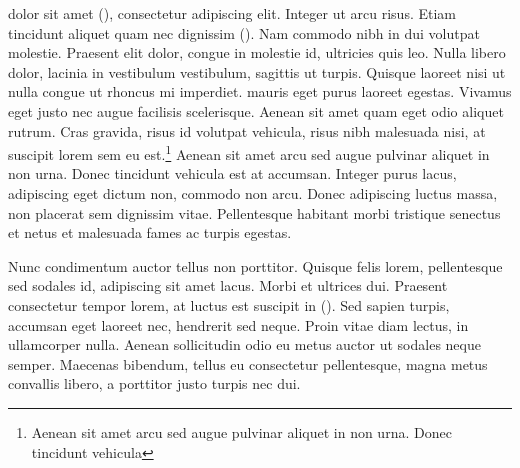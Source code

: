 
{}
 dolor sit amet (), consectetur adipiscing elit.\citep{Nacuzzi:2007} Integer ut arcu risus. Etiam tincidunt aliquet quam nec dignissim (). Nam commodo nibh in dui volutpat molestie. Praesent elit dolor, congue in molestie id, ultricies quis leo. Nulla libero dolor, lacinia in vestibulum vestibulum, sagittis ut turpis. Quisque laoreet nisi ut nulla congue ut rhoncus mi imperdiet.  mauris eget purus laoreet egestas.\citep{Cooper:1939} Vivamus eget justo nec augue facilisis scelerisque. Aenean sit amet quam eget odio aliquet rutrum. Cras gravida, risus id volutpat vehicula, risus nibh malesuada nisi, at suscipit lorem sem eu est.\footnote{Aenean sit amet arcu sed augue pulvinar aliquet in non urna. Donec tincidunt vehicula} Aenean sit amet arcu sed augue pulvinar aliquet in non urna. Donec tincidunt vehicula est at accumsan. Integer purus lacus, adipiscing eget dictum non, commodo non arcu. Donec adipiscing luctus massa, non placerat sem dignissim vitae. Pellentesque habitant morbi tristique senectus et netus et malesuada fames ac turpis egestas.\citep{Fernandez:1892,carlin2010linguistics}

\lbpsepline

Nunc condimentum auctor tellus non porttitor.\citep{Febre:2005,algonquina:wigwams:online} Quisque felis lorem, pellentesque sed sodales id, adipiscing sit amet lacus. Morbi et ultrices dui. Praesent consectetur tempor lorem, at luctus est suscipit in (). Sed sapien turpis, accumsan eget laoreet nec, hendrerit sed neque. Proin vitae diam lectus, in ullamcorper nulla.\citep{Sultzman:1999} Aenean sollicitudin odio eu metus auctor ut sodales neque semper. Maecenas bibendum, tellus eu consectetur pellentesque, magna metus convallis libero, a porttitor justo turpis nec dui.\citep{Britannica:Tehuelche:Online,Guia:Patagonia}